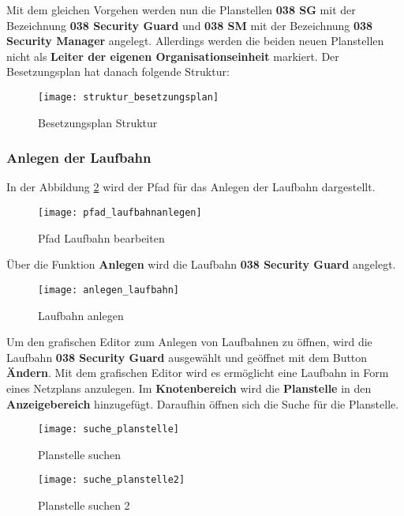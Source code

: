 Mit dem gleichen Vorgehen werden nun die Planstellen \textbf{038 SG} mit der Bezeichnung \textbf{038 Security Guard} und \textbf{038 SM} mit der Bezeichnung \textbf{038 Security Manager} angelegt. Allerdings werden die beiden neuen Planstellen nicht als \textbf{Leiter der eigenen Organisationseinheit} markiert. Der Besetzungsplan hat danach folgende Struktur:

\begin{figure}[H]
	\centering
	\texttt{[image: struktur\_besetzungsplan]}
	\caption{Besetzungsplan Struktur}
	\label{fig:struktur_besetzungsplan}
\end{figure}

\subsubsection{Anlegen der Laufbahn}
In der Abbildung \ref{fig:pfad_laufbahnanlegen} wird der Pfad für das Anlegen der Laufbahn dargestellt.

\begin{figure}[H]
	\centering
	\texttt{[image: pfad\_laufbahnanlegen]}
	\caption{Pfad Laufbahn bearbeiten}
	\label{fig:pfad_laufbahnanlegen}
\end{figure}

Über die Funktion \textbf{Anlegen} wird die Laufbahn \textbf{038 Security Guard} angelegt.

\begin{figure}[H]
	\centering
	\texttt{[image: anlegen\_laufbahn]}
	\caption{Laufbahn anlegen}
	\label{fig:anlegen_laufbahn}
\end{figure}

Um den grafischen Editor zum Anlegen von Laufbahnen zu öffnen, wird die Laufbahn \textbf{038 Security Guard} ausgewählt und geöffnet mit dem Button \textbf{Ändern}. Mit dem grafischen Editor wird es ermöglicht eine Laufbahn in Form eines Netzplans anzulegen. Im \textbf{Knotenbereich} wird die \textbf{Planstelle} in den \textbf{Anzeigebereich} hinzugefügt. Daraufhin öffnen sich die Suche für die Planstelle.

\begin{figure}[H]
	\centering
	\texttt{[image: suche\_planstelle]}
	\caption{Planstelle suchen}
	\label{fig:suche_planstelle}
\end{figure}
\begin{figure}[H]
	\centering
	\texttt{[image: suche\_planstelle2]}
	\caption{Planstelle suchen 2}
	\label{fig:suche_planstelle2}
\end{figure}

